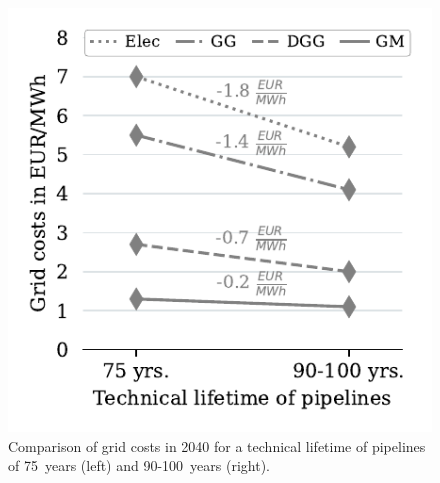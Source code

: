 \begin{figure}[h]
	\centering
	\includegraphics[width=0.6\linewidth]{figures/results/grid_charges_development/cleaned_grid_charges.pdf}
	\caption{Comparison of grid costs in 2040 for a technical lifetime of pipelines of \SI{75}{years} (left) and 90-\SI{100}{years} (right).}
	\label{fig_grid_charges_no_capex}
\end{figure}
